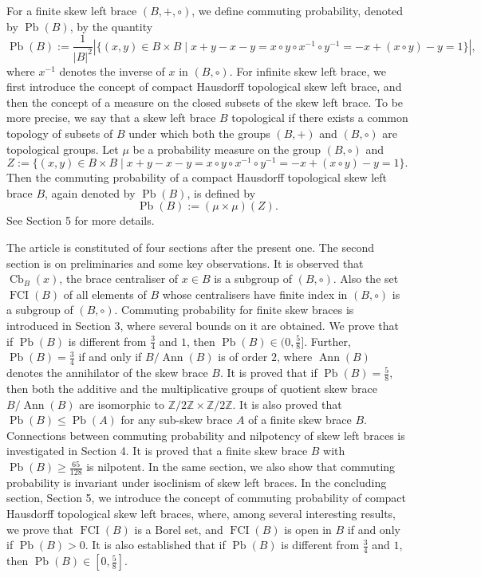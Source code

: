 \documentclass[oneside]{amsart}
\numberwithin{equation}{section}
\theoremstyle{plain}
\theoremstyle{definition}
\newcommand{\Cb}{\operatorname{Cb} }
\newcommand{\Pb}{\operatorname{Pb} }
\newcommand{\Ann}{\operatorname{Ann} }
\newcommand{\FCI}{\operatorname{FCI}}
\begin{document}
For a finite skew left brace $(B, +, \circ)$, we define commuting probability, denoted by $\Pb(B)$, by the quantity
$$\Pb(B) := \frac{1}{|B|^2} |\{(x, y)  \in B \times B \mid x + y -x -y = x \circ y \circ x^{-1} \circ y^{-1} = -x + (x \circ y) - y = 1\}|,$$
where $x^{-1}$ denotes the inverse of $x$ in $(B, \circ)$. For infinite skew left brace, we first introduce the concept of compact Hausdorff topological skew left brace, and then the concept of a measure on the closed subsets of the skew left brace. To be more precise, we say that a skew left brace $B$  topological  if there exists a common topology of subsets of $B$ under which both the groups $(B, +)$ and $(B, \circ)$ are topological groups. Let $\mu$ be a probability measure on the group $(B, \circ)$ and 
$$Z:= \{ (x, y)  \in B \times B \mid x + y -x -y = x \circ y \circ x^{-1} \circ y^{-1} = -x + (x \circ y) - y = 1\}.$$
Then the  commuting probability of a compact Hausdorff topological skew left brace $B$, again denoted by $\Pb(B)$, is defined by
$$\Pb(B) := (\mu \times \mu) (Z).$$
See Section 5 for more details.

The article is constituted of four sections after the present one. The second section is on preliminaries and some key observations. It is observed that $\Cb_B(x)$, the brace centraliser of $x \in B$ is a subgroup of $(B, \circ)$.  Also the set $\FCI(B)$ of all elements of $B$ whose centralisers have finite index in $(B, \circ)$ is a subgroup of $(B, \circ)$.  Commuting probability for finite skew braces is introduced in Section 3, where several bounds on it are obtained. We prove that if $\Pb(B)$ is different from  $\frac{3}{4}$ and $1$, then $\Pb(B) \in (0, \frac{5}{8}]$. Further,  $\Pb(B) = \frac{3}{4}$ if and only if  $B/\Ann(B)$ is of order $2$, where $\Ann(B)$ denotes the annihilator of the skew brace $B$. It is proved that if  $\Pb(B) = \frac{5}{8}$, then  both the additive and the multiplicative groups of quotient skew brace $B/\Ann(B)$ are isomorphic to $\mathbb{Z}/2\mathbb{Z} \times \mathbb{Z}/2\mathbb{Z}$. It is also proved that $\Pb(B) \leqslant \Pb(A)$ for any sub-skew brace $A$ of a finite skew brace $B$. Connections between commuting probability and  nilpotency of skew left braces is investigated in Section 4. It is proved that a finite skew brace $B$  with $\Pb(B) \ge \frac{65}{128}$ is nilpotent. In the same section, we also show that commuting probability is invariant under isoclinism of skew left braces. In the concluding section, Section 5, we introduce the concept of commuting probability of compact Hausdorff  topological skew left braces, where, among several interesting results,  we prove that $\FCI(B)$ is a Borel set, and $\FCI(B)$ is open in $B$ if and only if $\Pb(B) > 0$. It is also established that  if $\Pb(B)$ is different from  $\frac{3}{4}$ and $1$, then $\Pb(B) \in [0, \frac{5}{8}]$.
\end{document}
